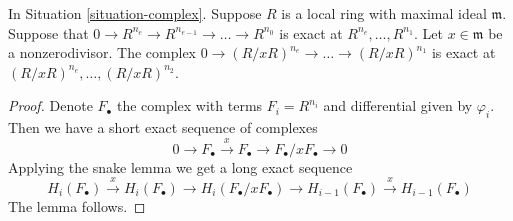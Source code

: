 \begin{lemma}
\label{lemma-div-x-exact-one-less}
In Situation \ref{situation-complex}. Suppose $R$ is
a local ring with maximal ideal $\mathfrak m$.
Suppose that $0 \to R^{n_e} \to R^{n_{e-1}} \to \ldots \to R^{n_0}$
is exact at $R^{n_e}, \ldots, R^{n_1}$.
Let $x \in \mathfrak m$ be a nonzerodivisor. The complex
$0 \to (R/xR)^{n_e} \to \ldots \to (R/xR)^{n_1}$
is exact at $(R/xR)^{n_e}, \ldots, (R/xR)^{n_2}$.
\end{lemma}

\begin{proof}
Denote $F_\bullet$ the complex with terms $F_i = R^{n_i}$
and differential given by $\varphi_i$. Then we have a short
exact sequence of complexes
$$
0 \to F_\bullet \xrightarrow{x} F_\bullet \to F_\bullet/xF_\bullet \to 0
$$
Applying the snake lemma we get a long exact sequence
$$
H_i(F_\bullet) \xrightarrow{x} H_i(F_\bullet) \to
H_i(F_\bullet/xF_\bullet) \to H_{i - 1}(F_\bullet)
\xrightarrow{x} H_{i - 1}(F_\bullet)
$$
The lemma follows.
\end{proof}
